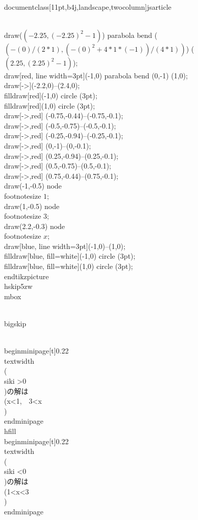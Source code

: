 \\documentclass[11pt,b4j,landscape,twocolumn]{jsarticle}
\begin{document}
\\draw($ (-2.25,{(-2.25)^2-1}) $) parabola bend ($ ({-(0)/(2*1)},{(-(0)^2+4*1*(-1))/(4*1)}) $) ($ (2.25,{(2.25)^2-1}) $);
\\draw[red, line width=3pt](-1,0) parabola bend (0,-1) (1,0);
\\draw[->](-2.2,0)--(2.4,0);
\\filldraw[red](-1,0) circle (3pt);
\\filldraw[red](1,0) circle (3pt);
\\draw[->,red] (-0.75,-0.44)--(-0.75,-0.1);
\\draw[->,red] (-0.5,-0.75)--(-0.5,-0.1);
\\draw[->,red] (-0.25,-0.94)--(-0.25,-0.1);
\\draw[->,red] (0,-1)--(0,-0.1);
\\draw[->,red] (0.25,-0.94)--(0.25,-0.1);
\\draw[->,red] (0.5,-0.75)--(0.5,-0.1);
\\draw[->,red] (0.75,-0.44)--(0.75,-0.1);
\\draw(-1,-0.5) node{\\footnotesize $1$};
\\draw(1,-0.5) node{\\footnotesize $3$};
\\draw(2.2,-0.3) node{\\footnotesize $x$};
\\draw[blue, line width=3pt](-1,0)--(1,0);
\\filldraw[blue, fill=white](-1,0) circle (3pt);
\\filldraw[blue, fill=white](1,0) circle (3pt);
\\end{tikzpicture}
\\hskip5zw\\mbox{}

\\bigskip

\\begin{minipage}[t]{0.22\\textwidth}
\\( \\siki >0\\)の解は\\(x<1,~~3<x\\)
\\end{minipage}
\\hfill
\\begin{minipage}[t]{0.22\\textwidth}
\\( \\siki <0\\)の解は\\(1<x<3\\)
\\end{minipage}
\end{document}
